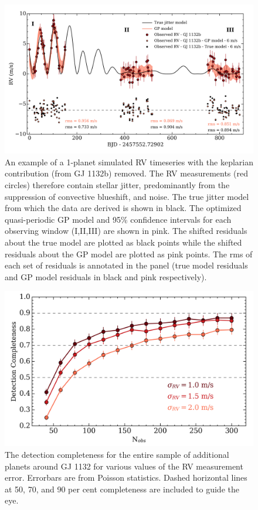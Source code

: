 \begin{figure}
\centering
\includegraphics[scale=.55]{figures/GPjitter.png}
\caption{An example of a 1-planet simulated RV timeseries with the
keplarian contribution (from GJ 1132b) removed. The RV measurements (red
circles) therefore contain stellar jitter, predominantly from the suppression of
convective blueshift, and noise. The true jitter model from which the data are
derived is shown in black. The optimized quasi-periodic GP model and 95\%
confidence intervals for each observing window (I,II,III) are shown in pink.
The shifted residuals about the true model are plotted as black points while the
shifted residuals about the
GP model are plotted as pink points. The rms of each set of residuals is
annotated in the panel (true model residuals and GP model residuals in black and
pink respectively). 
\label{fig:gj1132gp}}
\end{figure}

\begin{figure}
\centering
\includegraphics[scale=.6]{figures/detfreq.png}
\caption{The detection completeness for the entire sample of additional planets
around GJ 1132 for various values of the RV measurement error. Errorbars are
from Poisson statistics. Dashed
horizontal lines at 50, 70, and 90 per cent completeness are included to guide the eye. 
\label{fig:gj1132dc}}
\end{figure}

